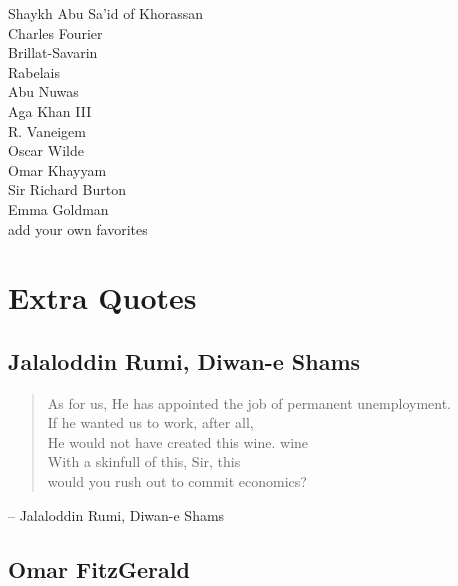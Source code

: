 \documentclass[a4paper,english,10pt,twoside]{article}
\begin{document}
\medskip
\begin{center}
Shaykh Abu Sa'id of Khorassan\\
Charles Fourier\\
Brillat-Savarin\\
Rabelais\\
Abu Nuwas\\
Aga Khan III\\
R. Vaneigem\\
Oscar Wilde\\
Omar Khayyam\\
Sir Richard Burton\\
Emma Goldman\\

\medskip
add your own favorites
\end{center}

\section{Extra Quotes}
\subsection{Jalaloddin Rumi, Diwan-e Shams}

\begin{verse}
    As for us, He has appointed the job of permanent unemployment.\\
    If he wanted us to work, after all,\\
    He would not have created this wine. wine\\
    With a skinfull of this, Sir, this\\
    would you rush out to commit economics?\\
\end{verse}

\begin{flushright} -- Jalaloddin Rumi, Diwan-e Shams\end{flushright}

\subsection{Omar FitzGerald}
\end{document}
